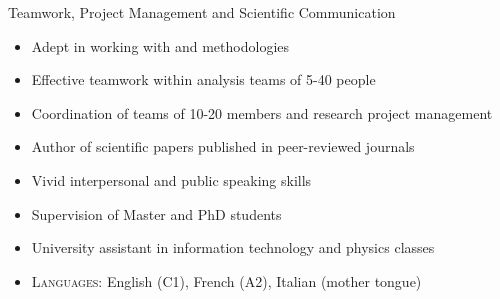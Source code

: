 \begin{cvskills}
\cvskill
{Teamwork, Project Management and Scientific Communication} %
{
\begin{minipage}{0.49\textwidth}
\vspace{0.3em}
\begin{itemize}[labelwidth=\the\widest,align=right,leftmargin=!,labelsep=1pt,noitemsep]
\item[\custItem] Adept in working with \textsc{\color{awesome}{Agile}} and
\textsc{\color{awesome}{Scrum}} methodologies
\item[\custItem] Effective teamwork within analysis teams of 5-40 people
\item[\custItem] Coordination of teams of 10-20 members and research project
management
\end{itemize}
\end{minipage}
\hfill
\begin{minipage}{0.49\textwidth}
\vspace{0.3em}
\begin{itemize}[labelwidth=\the\widest,align=right,leftmargin=!,labelsep=1pt,noitemsep]
\item[\custItem] Author of scientific papers published in peer-reviewed
journals
\item[\custItem] Vivid interpersonal and public speaking skills
\item[\custItem] Supervision of Master and PhD students
\item[\custItem] University assistant in information technology and physics classes
\end{itemize}
\end{minipage}
\begin{itemize}[labelwidth=\the\widest,align=right,leftmargin=!,labelsep=1pt,noitemsep]
\item[] \textsc{\color{awesome}Languages:} English (C1), French (A2),
Italian (mother tongue)
\end{itemize}
}
%

\end{cvskills}
